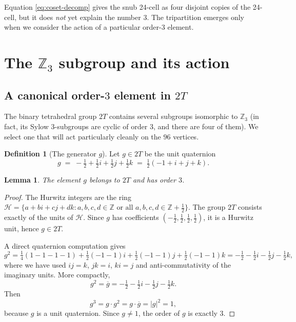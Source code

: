 \documentclass[10pt,reqno]{amsart}
\theoremstyle{plain}
\newtheorem{lemma}[theorem]{Lemma}
\theoremstyle{definition}
\newtheorem{definition}[theorem]{Definition}
\begin{document}
Equation \eqref{eq:coset-decomp} gives the snub 24-cell as four disjoint copies of the 24-cell, but it does \emph{not} yet explain the number $3$. The tripartition emerges only when we consider the action of a particular order-$3$ element.

\section{The $\mathbb{Z}_3$ subgroup and its action}\label{sec:z3}

\subsection{A canonical order-$3$ element in $2T$}

The binary tetrahedral group $2T$ contains several subgroups isomorphic to $\mathbb{Z}_3$ (in fact, its Sylow $3$-subgroups are cyclic of order $3$, and there are four of them). We select one that will act particularly cleanly on the $96$ vertices.

\begin{definition}[The generator $g$]\label{def:g}
Let $g \in 2T$ be the unit quaternion
\begin{equation}\label{eq:g-def}
g \;=\; -\tfrac12 + \tfrac12 i + \tfrac12 j + \tfrac12 k
\;=\; \tfrac12(-1 + i + j + k).
\end{equation}
\end{definition}

\begin{lemma}\label{lem:g-order}
The element $g$ belongs to $2T$ and has order $3$.
\end{lemma}

\begin{proof}
The Hurwitz integers are the ring $\mathcal{H} = \{ a + bi + cj + dk : a,b,c,d \in \mathbb{Z} \text{ or all } a,b,c,d \in \mathbb{Z} + \tfrac12 \}$. The group $2T$ consists exactly of the units of $\mathcal{H}$. Since $g$ has coefficients $(-\tfrac12, \tfrac12, \tfrac12, \tfrac12)$, it is a Hurwitz unit, hence $g \in 2T$.

A direct quaternion computation gives
\begin{equation}
g^2 = \tfrac14(1 - 1 - 1 - 1) + \tfrac12(-1 - 1)i + \tfrac12(-1 - 1)j + \tfrac12(-1 - 1)k
= -\tfrac12 - \tfrac12 i - \tfrac12 j - \tfrac12 k,
\end{equation}
where we have used $ij=k$, $jk=i$, $ki=j$ and anti-commutativity of the imaginary units. More compactly,
\begin{equation}
g^2 = \overline{g} = -\tfrac12 - \tfrac12 i - \tfrac12 j - \tfrac12 k.
\end{equation}
Then
\begin{equation}
g^3 = g \cdot g^2 = g \cdot \overline{g} = |g|^2 = 1,
\end{equation}
because $g$ is a unit quaternion. Since $g \neq 1$, the order of $g$ is exactly $3$.
\end{proof}
\end{document}
